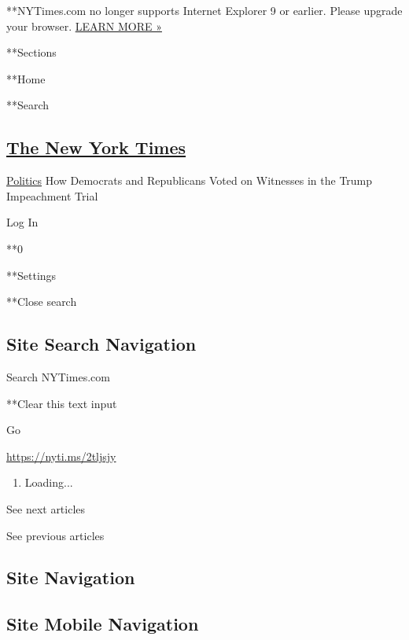  **NYTimes.com no longer supports Internet Explorer 9 or earlier. Please
upgrade your browser.
\href{http://www.nytimes3xbfgragh.onion/content/help/site/ie9-support.html}{LEARN
MORE »}

**Sections

**Home

**Search

\hypertarget{the-new-york-times}{%
\subsection{\texorpdfstring{\href{http://www.nytimes3xbfgragh.onion/}{The
New York Times}}{The New York Times}}\label{the-new-york-times}}

 \href{/section/politics}{Politics} \textbar{}How Democrats and
Republicans Voted on Witnesses in the Trump Impeachment Trial

Log In

**0

**Settings

**Close search

\hypertarget{site-search-navigation}{%
\subsection{Site Search Navigation}\label{site-search-navigation}}

Search NYTimes.com

**Clear this text input

Go

\url{https://nyti.ms/2tljsjy}

\begin{enumerate}
\def\labelenumi{\arabic{enumi}.}
\item
  Loading...
\end{enumerate}

See next articles

See previous articles

\hypertarget{site-navigation}{%
\subsection{Site Navigation}\label{site-navigation}}

\hypertarget{site-mobile-navigation}{%
\subsection{Site Mobile Navigation}\label{site-mobile-navigation}}

